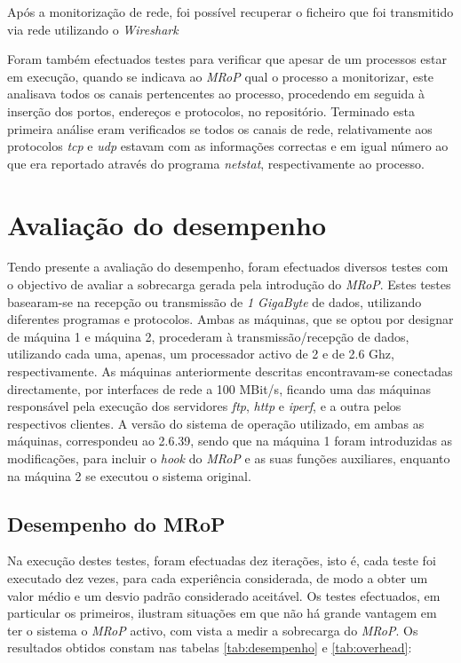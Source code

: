 Após a monitorização de rede, foi possível recuperar o ficheiro que foi transmitido via rede utilizando o \textit{Wireshark}

Foram também efectuados testes para verificar que apesar de um processos estar em execução, quando se indicava ao \textit{MRoP} qual o processo a monitorizar, este analisava todos os canais pertencentes ao processo, procedendo em seguida à inserção dos portos, endereços e protocolos, no repositório.
Terminado esta primeira análise eram verificados se todos os canais de rede, relativamente aos protocolos \textit{tcp} e \textit{udp} estavam com as informações correctas e em igual número ao que era reportado através do programa \textit{netstat}, respectivamente ao processo.


\section{Avaliação do desempenho}
\label{sec:eval_performance}

Tendo presente a avaliação do desempenho, foram efectuados diversos testes com o objectivo de avaliar a sobrecarga gerada pela introdução do \textit{MRoP}.
Estes testes basearam-se na recepção ou transmissão de \textit{1 GigaByte} de dados, utilizando diferentes programas e protocolos.
Ambas as máquinas, que se optou por designar de máquina 1 e máquina 2, procederam à transmissão/recepção de dados, utilizando cada uma, apenas, um processador activo de 2 e de 2.6 Ghz, respectivamente.
As máquinas anteriormente descritas encontravam-se conectadas directamente, por interfaces de rede a 100 MBit/s, ficando uma das máquinas responsável pela execução dos servidores \textit{ftp}, \textit{http} e \textit{iperf}, e a outra pelos respectivos clientes.
A versão do sistema de operação utilizado, em ambas as máquinas, correspondeu ao 2.6.39, sendo que na máquina 1 foram introduzidas as modificações, para incluir o \textit{hook} do \textit{MRoP} e as suas funções auxiliares, enquanto na máquina 2 se executou o sistema original.

\subsection{Desempenho do MRoP}


Na execução destes testes, foram efectuadas dez iterações, isto é, cada teste foi executado dez vezes, para cada experiência considerada, de modo a obter um valor médio e um desvio padrão considerado aceitável.
Os testes efectuados, em particular os primeiros, ilustram situações em que não há grande vantagem em ter o sistema o \textit{MRoP} activo, com vista a medir a sobrecarga do \textit{MRoP}.
Os resultados obtidos constam nas tabelas \ref{tab:desempenho} e \ref{tab:overhead}:

